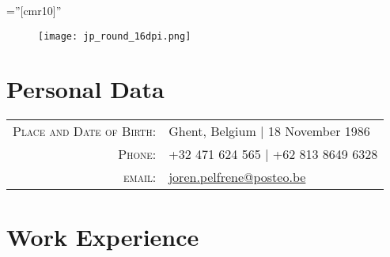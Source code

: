 \documentclass[a4paper,10pt]{article} %
\begin{document}
\pagestyle{empty} %

\font\fb=''[cmr10]'' %


\par{\bigskip\par} %

\begin{figure}
\centering
\texttt{[image: jp\_round\_16dpi.png]}
\end{figure}

\section{Personal Data}

\begin{tabular}{rl}
\textsc{Place and Date of Birth:} & Ghent, Belgium  | 18 November 1986 \\
\textsc{Phone:} & +32 471 624 565 | +62 813 8649 6328\\
\textsc{email:} & \href{mailto:joren.pelfrene@posteo.be}{joren.pelfrene@posteo.be}
\end{tabular}


\section{Work Experience}
\end{document}
